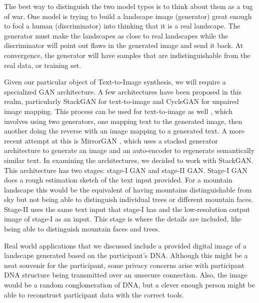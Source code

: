 \documentclass{article}
\begin{document}
	The best way to distinguish the two model types is to think about them as a tug of war. One model is trying to build a landscape image (generator) great enough to fool a human (discriminator) into thinking that it is a real landscape. The generator must make the landscapes as close to real landscapes while the discriminator will point out flaws in the generated image and send it back. At convergence, the generator will have samples that are indistinguishable from the real data, or training set.  

	Given our particular object of Text-to-Image synthesis, we will require a specialized GAN architecture. A few architectures have been proposed in this realm, particularly StackGAN \cite{zhang2017stackgan} for text-to-image and CycleGAN \cite{CycleGAN2017} for unpaired image mapping. This process can be used for text-to-image as well \cite{BERT2020}, which involves using two generators, one mapping text to the generated image, then another doing the reverse with an image mapping to a generated text. A more recent attempt at this is MirrorGAN \cite{qiao2019mirrorgan}, which uses a stacked generator architecture to generate an image and an auto-encoder to regenerate semantically similar text. In examining the architectures, we decided to work with StackGAN. This architecture has two stages: stage-I GAN and stage-II GAN. Stage-I GAN does a rough estimation sketch of the text input provided. For a mountain landscape this would be the equivalent of having mountains distinguishable from sky but not being able to distinguish individual trees or different mountain faces. Stage-II uses the same text input that stage-I has and the low-resolution output image of stage-I as an input. This stage is where the details are included, like being able to distinguish mountain faces and trees.   

	Real world applications that we discussed include a provided digital image of a landscape generated based on the participant’s DNA. Although this might be a neat souvenir for the participant, some privacy concerns arise with participant DNA structure being transmitted over an unsecure connection. Also, the image would be a random conglomeration of DNA, but a clever enough person might be able to reconstruct participant data with the correct tools. 
\end{document}
